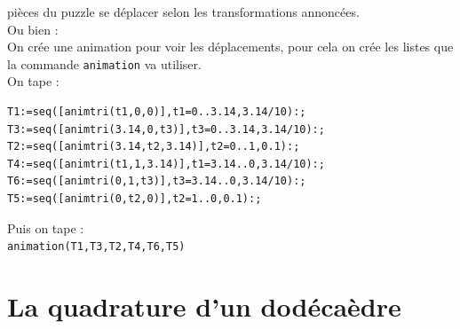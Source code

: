 \documentclass[a4paper,11pt]{book}
\begin{document}
pi\`eces du puzzle se d\'eplacer selon les transformations annonc\'ees.\\
Ou bien :\\
On cr\'ee une animation pour voir les d\'eplacements, pour cela on 
cr\'ee les listes que la commande {\tt animation} va utiliser.\\
On tape :\\
\begin{verbatim}
T1:=seq([animtri(t1,0,0)],t1=0..3.14,3.14/10):;
T3:=seq([animtri(3.14,0,t3)],t3=0..3.14,3.14/10):;
T2:=seq([animtri(3.14,t2,3.14)],t2=0..1,0.1):;
T4:=seq([animtri(t1,1,3.14)],t1=3.14..0,3.14/10):;
T6:=seq([animtri(0,1,t3)],t3=3.14..0,3.14/10):;
T5:=seq([animtri(0,t2,0)],t2=1..0,0.1):;
\end{verbatim}
Puis on tape :\\
{\tt animation(T1,T3,T2,T4,T6,T5)}
\section{La quadrature d'un dod\'eca\`edre}
\end{document}
